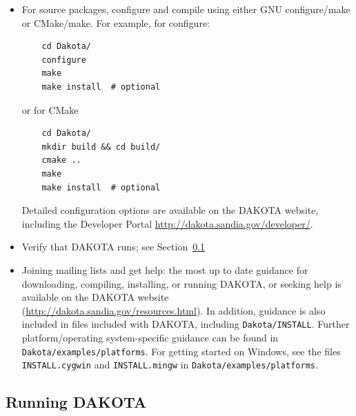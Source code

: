 \begin{itemize}
  \item For source packages, configure and compile using either GNU
    configure/make or CMake/make.  For example, for configure:
    \begin{small}
\begin{verbatim}
    cd Dakota/
    configure
    make
    make install  # optional
\end{verbatim}
    \end{small}
    or for CMake
    \begin{small}
\begin{verbatim}
    cd Dakota/
    mkdir build && cd build/
    cmake ..
    make
    make install  # optional
\end{verbatim}
    \end{small}
    Detailed configuration options are available on the DAKOTA
    website, including the Developer Portal
    \url{http://dakota.sandia.gov/developer/}.
    
  \item Verify that DAKOTA runs; see
    Section~\ref{tutorial:installation:running}

  \item Joining mailing lists and get help: the most up to date
    guidance for downloading, compiling, installing, or running
    DAKOTA, or seeking help is available on the DAKOTA website \\
    (\url{http://dakota.sandia.gov/resources.html}). In addition,
    guidance is also included in files included with DAKOTA, including
    \texttt{Dakota/INSTALL}. Further platform/operating
    system-specific guidance can be found in {\tt
    Dakota/examples/platforms}.  For getting started on Windows, see
    the files \texttt{INSTALL.cygwin} and \texttt{INSTALL.mingw} in
    \texttt{Dakota/examples/platforms}.
\end{itemize}


\subsection{Running DAKOTA}\label{tutorial:installation:running}

